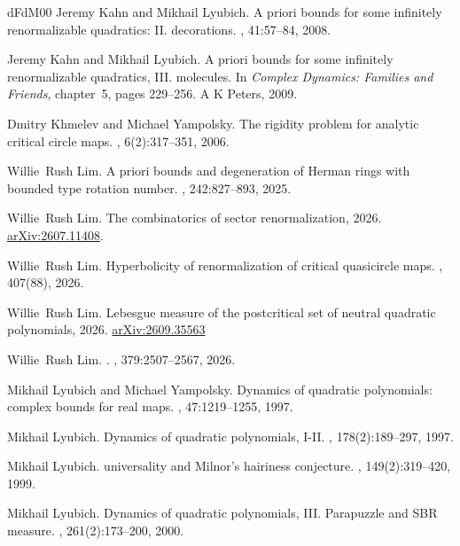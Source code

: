 \documentclass{amsart}
\begin{document}
\begin{thebibliography}{dFdM00}
Jeremy Kahn and Mikhail Lyubich.
\newblock A priori bounds for some infinitely renormalizable quadratics: {II}. decorations.
, 41:57--84, 2008.

Jeremy Kahn and Mikhail Lyubich.
\newblock A priori bounds for some infinitely renormalizable quadratics, {III}. molecules.
\newblock In {\em Complex Dynamics: Families and Friends}, chapter~5, pages 229--256. A K Peters, 2009.

Dmitry Khmelev and Michael Yampolsky.
\newblock The rigidity problem for analytic critical circle maps.
, 6(2):317--351, 2006.

Willie~Rush Lim.
\newblock A priori bounds and degeneration of {Herman} rings with bounded type rotation number.
, 242:827--893, 2025.

Willie~Rush Lim.
\newblock The combinatorics of sector renormalization, 2026.
\newblock \href{https://arxiv.org/abs/2607.11408}{arXiv:2607.11408}.

Willie~Rush Lim.
\newblock Hyperbolicity of renormalization of critical quasicircle maps.
, 407(88), 2026.

Willie~Rush Lim.
\newblock Lebesgue measure of the postcritical set of neutral quadratic polynomials, 2026.
\newblock \href{https://arxiv.org/abs/2609.35563}{arXiv:2609.35563}

Willie~Rush Lim.
.
, 379:2507--2567, 2026.

Mikhail Lyubich and Michael Yampolsky.
\newblock Dynamics of quadratic polynomials: complex bounds for real maps.
, 47:1219--1255, 1997.

Mikhail Lyubich.
\newblock Dynamics of quadratic polynomials, {I-II}.
, 178(2):189--297, 1997.

Mikhail Lyubich.
 universality and {Milnor}'s hairiness conjecture.
, 149(2):319--420, 1999.

Mikhail Lyubich.
\newblock Dynamics of quadratic polynomials, {III. Parapuzzle and SBR measure}.
, 261(2):173--200, 2000.


\end{thebibliography}
\end{document}
